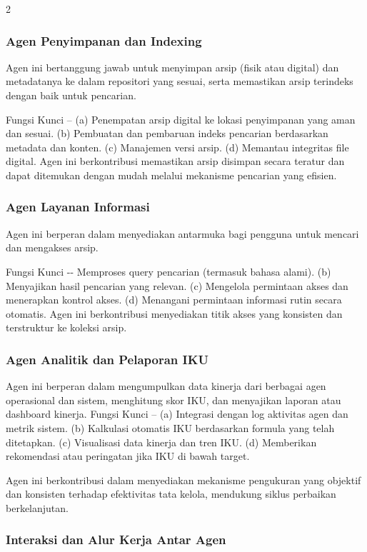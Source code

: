 \documentclass[12pt,a4paper]{article}
\begin{document}
\begin{multicols}{2}
\subsubsection{Agen Penyimpanan dan Indexing}

Agen ini bertanggung jawab untuk menyimpan arsip (fisik atau digital) dan metadatanya ke dalam repositori yang sesuai, serta memastikan arsip terindeks dengan baik untuk pencarian.

Fungsi Kunci -- (a) Penempatan arsip digital ke lokasi penyimpanan yang aman dan sesuai. (b) Pembuatan dan pembaruan indeks pencarian berdasarkan metadata dan konten. (c) Manajemen versi arsip. (d) Memantau integritas file digital. Agen ini berkontribusi memastikan arsip disimpan secara teratur dan dapat ditemukan dengan mudah melalui mekanisme pencarian yang efisien.

\subsubsection{Agen Layanan Informasi}

Agen ini berperan dalam menyediakan antarmuka bagi pengguna untuk mencari dan mengakses arsip.

Fungsi Kunci -\/- Memproses query pencarian (termasuk bahasa alami). (b) Menyajikan hasil pencarian yang relevan. (c) Mengelola permintaan akses dan menerapkan kontrol akses. (d) Menangani permintaan informasi rutin secara otomatis. Agen ini berkontribusi menyediakan titik akses yang konsisten dan terstruktur ke koleksi arsip.

\subsubsection{Agen Analitik dan Pelaporan IKU}

Agen ini berperan dalam mengumpulkan data kinerja dari berbagai agen operasional dan sistem, menghitung skor IKU, dan menyajikan laporan atau dashboard kinerja. Fungsi Kunci -- (a) Integrasi dengan log aktivitas agen dan metrik sistem. (b) Kalkulasi otomatis IKU berdasarkan formula yang telah ditetapkan. (c) Visualisasi data kinerja dan tren IKU. (d) Memberikan rekomendasi atau peringatan jika IKU di bawah target.

Agen ini berkontribusi dalam menyediakan mekanisme pengukuran yang objektif dan konsisten terhadap efektivitas tata kelola, mendukung siklus perbaikan berkelanjutan.

\subsubsection{Interaksi dan Alur Kerja Antar Agen}


\end{multicols}
\end{document}
